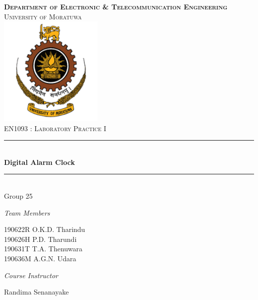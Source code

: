 \newcommand{\HRule}{\rule{\linewidth}{0.5mm}} 

\begin{titlepage}
\center
\textsc{
\Huge \textbf{Department of Electronic \& Telecommunication Engineering}\\[.5cm]
\Large
University of Moratuwa\\[1.5cm] 
\includegraphics[width=5cm]{Picture1.png}\\[2cm]
EN1093 : Laboratory Practice I}\\[1.5cm] 


\sffamily
\HRule \\[0.4cm]
\textbf{\Huge Digital Alarm Clock}\\[0.2cm] 
\HRule \\[1cm]
 \Large
Group 25\\[5mm]
\large
\begin{minipage}[t]{.5\textwidth}
\begin{flushleft}
\emph{ \Large Team Members}

\large 190622R \quad O.K.D. Tharindu\\
\large 190626H \quad P.D. Tharundi \\
\large 190631T \quad T.A. Thenuwara\\
\large 190636M \quad A.G.N. Udara\\
\end{flushleft}

\end{minipage}\hfill\begin{minipage}[t]{.4\textwidth}

\begin{flushright}
\emph{ \Large Course Instructor} 

Randima Senanayake\\ 

\end{flushright}
\end{minipage}
\end{titlepage}

